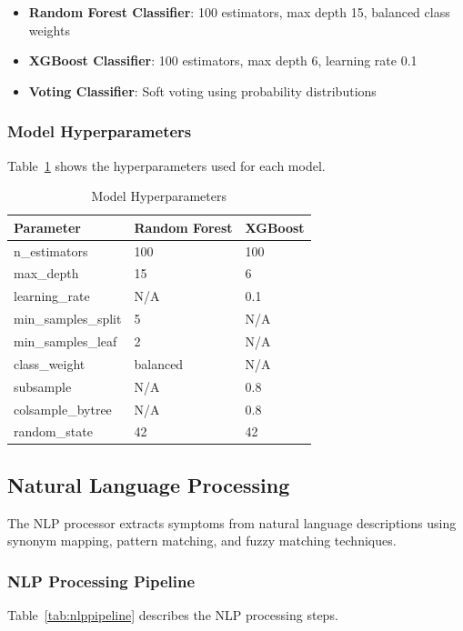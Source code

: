 \documentclass[12pt,a4paper]{article}
\begin{document}
\begin{itemize}
    \item \textbf{Random Forest Classifier}: 100 estimators, max depth 15, balanced class weights
    \item \textbf{XGBoost Classifier}: 100 estimators, max depth 6, learning rate 0.1
    \item \textbf{Voting Classifier}: Soft voting using probability distributions
\end{itemize}

\subsubsection{Model Hyperparameters}
Table~\ref{tab:hyperparameters} shows the hyperparameters used for each model.

\begin{table}[H]
\centering
\caption{Model Hyperparameters}
\label{tab:hyperparameters}
\begin{tabularx}{0.8\textwidth}{|l|X|X|}
\hline
\textbf{Parameter} & \textbf{Random Forest} & \textbf{XGBoost} \\
\hline
n\_estimators & 100 & 100 \\
\hline
max\_depth & 15 & 6 \\
\hline
learning\_rate & N/A & 0.1 \\
\hline
min\_samples\_split & 5 & N/A \\
\hline
min\_samples\_leaf & 2 & N/A \\
\hline
class\_weight & balanced & N/A \\
\hline
subsample & N/A & 0.8 \\
\hline
colsample\_bytree & N/A & 0.8 \\
\hline
random\_state & 42 & 42 \\
\hline
\end{tabularx}
\end{table}

\subsection{Natural Language Processing}
The NLP processor extracts symptoms from natural language descriptions using synonym mapping, pattern matching, and fuzzy matching techniques.

\subsubsection{NLP Processing Pipeline}
Table~\ref{tab:nlppipeline} describes the NLP processing steps.
\end{document}
